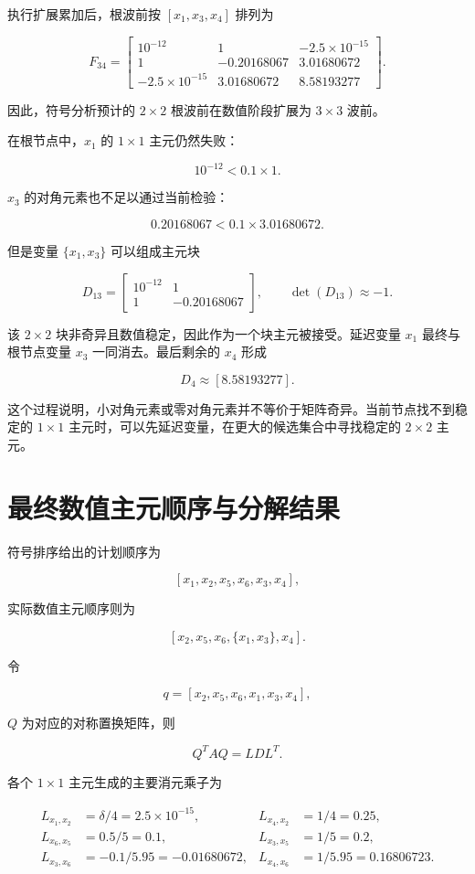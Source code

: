 执行扩展累加后，根波前按 $[x_1,x_3,x_4]$ 排列为

\[
F_{34}=
\begin{bmatrix}
10^{-12}&1&-2.5\times10^{-15}\\
1&-0.20168067&3.01680672\\
-2.5\times10^{-15}&3.01680672&8.58193277
\end{bmatrix}.
\]

因此，符号分析预计的 $2\times2$ 根波前在数值阶段扩展为 $3\times3$ 波前。

在根节点中，$x_1$ 的 $1\times1$ 主元仍然失败：

\[
10^{-12}<0.1\times1.
\]

$x_3$ 的对角元素也不足以通过当前检验：

\[
0.20168067<0.1\times3.01680672.
\]

但是变量 $\{x_1,x_3\}$ 可以组成主元块

\[
D_{13}=
\begin{bmatrix}
10^{-12}&1\\
1&-0.20168067
\end{bmatrix},
\qquad
\det(D_{13})\approx-1.
\]

该 $2\times2$ 块非奇异且数值稳定，因此作为一个块主元被接受。延迟变量 $x_1$ 最终与根节点变量 $x_3$ 一同消去。最后剩余的 $x_4$ 形成

\[
D_4\approx[8.58193277].
\]

这个过程说明，小对角元素或零对角元素并不等价于矩阵奇异。当前节点找不到稳定的 $1\times1$ 主元时，可以先延迟变量，在更大的候选集合中寻找稳定的 $2\times2$ 主元。

\section{最终数值主元顺序与分解结果}

符号排序给出的计划顺序为

\[
[x_1,x_2,x_5,x_6,x_3,x_4],
\]

实际数值主元顺序则为

\[
[x_2,x_5,x_6,\{x_1,x_3\},x_4].
\]

令

\[
q=[x_2,x_5,x_6,x_1,x_3,x_4],
\]

$Q$ 为对应的对称置换矩阵，则

\[
Q^TAQ=LDL^T.
\]

各个 $1\times1$ 主元生成的主要消元乘子为

\begin{align*}
L_{x_1,x_2}&=\delta/4=2.5\times10^{-15},
&L_{x_4,x_2}&=1/4=0.25,\\
L_{x_6,x_5}&=0.5/5=0.1,
&L_{x_3,x_5}&=1/5=0.2,\\
L_{x_3,x_6}&=-0.1/5.95=-0.01680672,
&L_{x_4,x_6}&=1/5.95=0.16806723.
\end{align*}


